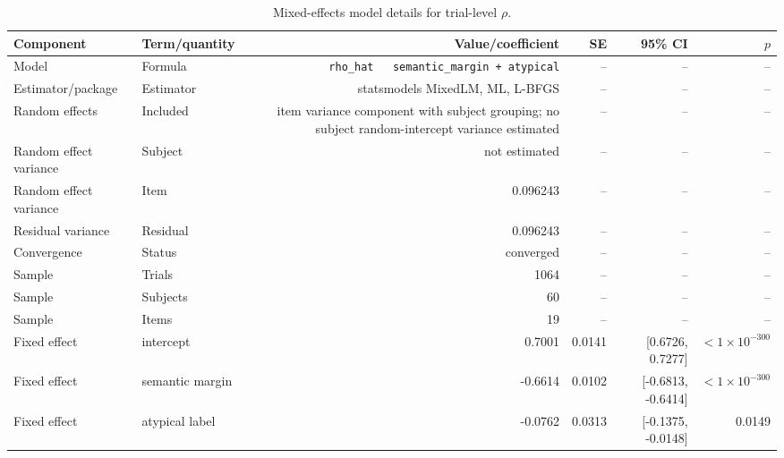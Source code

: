 \begin{table}[htbp]
\centering
\small
\caption{Mixed-effects model details for trial-level $\rho$.}
\label{tab:mixed-effects-details}
\begin{tabular}{llrrrr}
\toprule
Component & Term/quantity & Value/coefficient & SE & 95\% CI & $p$ \\
\midrule
Model & Formula & \texttt{rho\_hat ~ semantic\_margin + atypical} & -- & -- & -- \\
Estimator/package & Estimator & statsmodels MixedLM, ML, L-BFGS & -- & -- & -- \\
Random effects & Included & item variance component with subject grouping; no subject random-intercept variance estimated & -- & -- & -- \\
Random effect variance & Subject & not estimated & -- & -- & -- \\
Random effect variance & Item & 0.096243 & -- & -- & -- \\
Residual variance & Residual & 0.096243 & -- & -- & -- \\
Convergence & Status & converged & -- & -- & -- \\
Sample & Trials & 1064 & -- & -- & -- \\
Sample & Subjects & 60 & -- & -- & -- \\
Sample & Items & 19 & -- & -- & -- \\
Fixed effect & intercept & 0.7001 & 0.0141 & [0.6726, 0.7277] & $<1\times10^{-300}$ \\
Fixed effect & semantic margin & -0.6614 & 0.0102 & [-0.6813, -0.6414] & $<1\times10^{-300}$ \\
Fixed effect & atypical label & -0.0762 & 0.0313 & [-0.1375, -0.0148] & 0.0149 \\
\bottomrule
\end{tabular}
\end{table}
